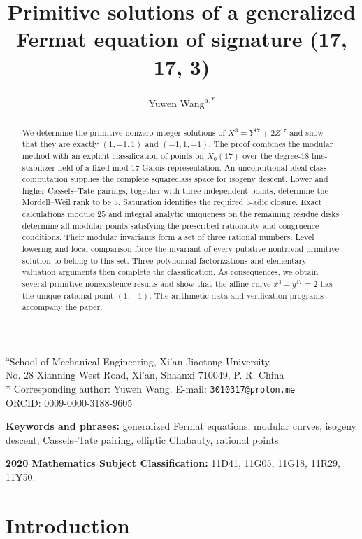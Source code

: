 \documentclass[11pt,a4paper]{article}
\title{Primitive solutions of a generalized Fermat equation of signature (17, 17, 3)}
\author{Yuwen Wang\texorpdfstring{\textsuperscript{a,*}}{}}
\date{}
\theoremstyle{definition}\newtheorem{definition}[theorem]{Definition}
\theoremstyle{remark}\newtheorem{remark}[theorem]{Remark}
\begin{document}
\maketitle
\begin{center}
\textsuperscript{a}School of Mechanical Engineering, Xi'an Jiaotong University\\
No. 28 Xianning West Road, Xi'an, Shaanxi 710049, P. R. China\\
* Corresponding author: Yuwen Wang. E-mail: \texttt{3010317@proton.me}\\
ORCID: 0009-0000-3188-9605
\end{center}



\begin{abstract}
We determine the primitive nonzero integer solutions of $X^3=Y^{17}+2Z^{17}$ and show that they are exactly $(1,-1,1)$ and $(-1,1,-1)$. The proof combines the modular method with an explicit classification of points on $X_0(17)$ over the degree-$18$ line-stabilizer field of a fixed mod-$17$ Galois representation. An unconditional ideal-class computation supplies the complete squareclass space for isogeny descent. Lower and higher Cassels--Tate pairings, together with three independent points, determine the Mordell--Weil rank to be $3$. Saturation identifies the required $5$-adic closure. Exact calculations modulo $25$ and integral analytic uniqueness on the remaining residue disks determine all modular points satisfying the prescribed rationality and congruence conditions. Their modular invariants form a set of three rational numbers. Level lowering and local comparison force the invariant of every putative nontrivial primitive solution to belong to this set. Three polynomial factorizations and elementary valuation arguments then complete the classification. As consequences, we obtain several primitive nonexistence results and show that the affine curve $x^3-y^{17}=2$ has the unique rational point $(1,-1)$. The arithmetic data and verification programs accompany the paper.
\end{abstract}

\noindent\textbf{Keywords and phrases:} generalized Fermat equations, modular curves, isogeny descent, Cassels--Tate pairing, elliptic Chabauty, rational points.

\noindent\textbf{2020 Mathematics Subject Classification:} 11D41, 11G05, 11G18, 11R29, 11Y50.


\section{Introduction}
\end{document}
